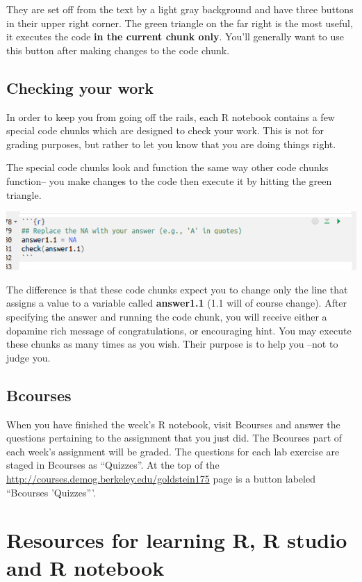 \documentclass[11pt]{article}
\begin{document}
They are set off from the text by a light gray background and have three buttons in their upper right corner.  The green triangle on the far right is the most useful, it executes the code \textbf{in the current chunk only}. You'll generally want to use this button after making changes to the code chunk.

\subsection{Checking your work}

In order to keep you from going off the rails, each R notebook contains a few special code chunks which are designed to check your work. This is not for grading purposes, but rather to let you know that you are doing things right.

The special code chunks look and function the same way other code chunks function-- you make changes to the code then execute it by hitting the green triangle.

\includegraphics[scale=.5]{RstudioCheck}

The difference is that these code chunks expect you to change only the line that assigns a value to a variable called \textbf{answer1.1} (1.1 will of course change).  After specifying the answer and running the code chunk, you will receive either a dopamine rich message of congratulations, or encouraging hint.  You may execute these chunks as many times as you wish. Their purpose is to help you --not to judge you.

\subsection{Bcourses}

When you have finished the week's R notebook, visit Bcourses and answer the questions pertaining to the assignment that you just did.  The Bcourses part of each week's assignment will be graded. The questions for each lab exercise are staged in Bcourses as ``Quizzes''. At the top of the \url{http://courses.demog.berkeley.edu/goldstein175} page is a button labeled ``Bcourses 'Quizzes'''.

\section{Resources for learning R, R studio and R notebook}
\end{document}
